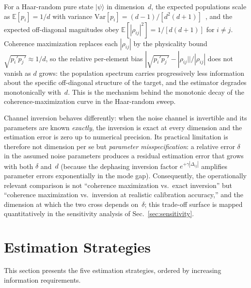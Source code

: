 \documentclass[a4paper,onecolumn]{quantumarticle}
\begin{document}
For a Haar-random pure state $|\psi\rangle$ in dimension~$d$, the expected populations scale as $\mathbb{E}[p_i] = 1/d$ with variance $\mathrm{Var}[p_i] = (d-1)/[d^2(d+1)]$~\cite{NielsenChuang2010}, and the expected off-diagonal magnitudes obey $\mathbb{E}[|\rho_{ij}|^2] = 1/[d(d+1)]$ for $i \neq j$.
Coherence maximization replaces each $|\rho_{ij}|$ by the physicality bound $\sqrt{p_i' p_j'} \approx 1/d$, so the relative per-element bias $|\sqrt{p_i' p_j'} - |\rho_{ij}||/|\rho_{ij}|$ does not vanish as $d$ grows: the population spectrum carries progressively less information about the specific off-diagonal structure of the target, and the estimator degrades monotonically with~$d$.
This is the mechanism behind the monotonic decay of the coherence-maximization curve in the Haar-random sweep.

Channel inversion behaves differently: when the noise channel is invertible and its parameters are known \emph{exactly}, the inversion is exact at every dimension and the estimation error is zero up to numerical precision.
Its practical limitation is therefore not dimension per se but \emph{parameter misspecification}: a relative error $\delta$ in the assumed noise parameters produces a residual estimation error that grows with both $\delta$ and~$d$ (because the dephasing inversion factor $e^{+\gamma|\Delta_{ij}|}$ amplifies parameter errors exponentially in the mode gap).
Consequently, the operationally relevant comparison is not ``coherence maximization vs.\ exact inversion'' but ``coherence maximization vs.\ inversion at realistic calibration accuracy,'' and the dimension at which the two cross depends on~$\delta$; this trade-off surface is mapped quantitatively in the sensitivity analysis of Sec.~\ref{sec:sensitivity}.


\section{Estimation Strategies}
\label{sec:strategies}

This section presents the five estimation strategies, ordered by increasing information requirements.
\end{document}
